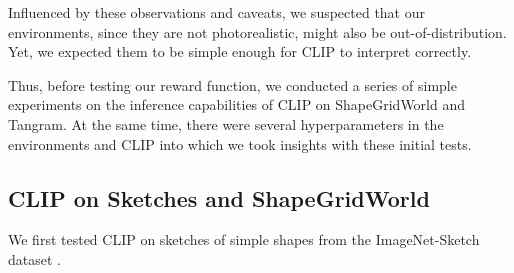 Influenced by these observations and caveats, we suspected that our environments, since they are not photorealistic, might also be out-of-distribution. 
Yet, we expected them to be simple enough for CLIP to interpret correctly.

Thus, before testing our reward function, we conducted a series of simple experiments on the inference capabilities of CLIP on ShapeGridWorld and Tangram.
At the same time, there were several hyperparameters in the environments and CLIP into which we took insights with these initial tests.


\subsection{CLIP on Sketches and ShapeGridWorld}
\label{sec:clip-sketches}

We first tested CLIP on sketches of simple shapes from the ImageNet-Sketch dataset \citep{imagenet}.

